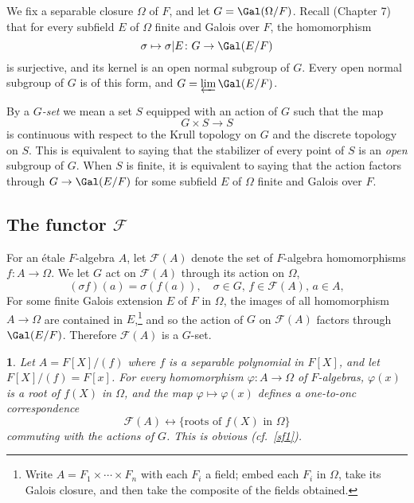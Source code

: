 \documentclass[a4paper,11pt,final,openany]{memoir}
\newtheorem{plain}[X]{}
\theoremstyle{nonumberplain}
\begin{document}
We fix a separable closure $\Omega$ of $F$, and let $G=\Gal(\Omega/F)$. Recall
(Chapter 7) that for every subfield $E$ of $\Omega$ finite and Galois over
$F$, the homomorphism%
\[
\sigma\mapsto\sigma|E\colon G\rightarrow\Gal(E/F)
\]
is surjective, and its kernel is an open normal subgroup of $G$. Every open
normal subgroup of $G$ is of this form, and $G=\varprojlim\Gal(E/F)$.

By a
%
$G$\emph{-set} we mean a set $S$ equipped with an action of $G$ such that the
map%
\[
G\times S\rightarrow S
\]
is continuous with respect to the Krull topology on $G$ and the discrete
topology on $S$. This is equivalent to saying that the stabilizer of every
point of $S$ is an \textit{open} subgroup of $G$. When $S$ is finite, it is
equivalent to saying that the action factors through $G\rightarrow\Gal(E/F)$
for some subfield $E$ of $\Omega$ finite and Galois over $F$.

\subsection{The functor $\mathcal{F}$}

For an \'{e}tale $F$-algebra $A$, let $\mathcal{F}{}(A)$ denote the set of
$F$-algebra homomorphisms $f\colon A\rightarrow\Omega$. We let $G$ act on
$\mathcal{F}{}(A)$ through its action on $\Omega$,%
\[
(\sigma f)(a)=\sigma(f(a)),\quad\sigma\in G\text{, }f\in\mathcal{F}%
{}(A)\text{, }a\in A,
\]
For some finite Galois extension $E$ of $F$ in $\Omega$, the images of all
homomorphism $A\rightarrow\Omega$ are contained in $E$,\footnote{Write
$A=F_{1}\times\cdots\times F_{n}$ with each $F_{i}$ a field; embed each
$F_{i}$ in $\Omega$, take its Galois closure, and then take the composite of
the fields obtained.} and so the action of $G$ on $\mathcal{F}(A)$ factors
through $\Gal(E/F)$. Therefore $\mathcal{F}{}(A)$ is a $G$-set.

\begin{plain}
\label{b74}Let $A=F[X]/(f)$ where $f$ is a separable polynomial in $F[X]$, and
let $F[X]/(f)=F[x]$. For every homomorphism $\varphi\colon A\rightarrow\Omega$
of $F$-algebras, $\varphi(x)$ is a root of $f(X)$ in $\Omega$, and the map
$\varphi\mapsto\varphi(x)$ defines a one-to-onc correspondence
\[
\mathcal{F}{}(A)\leftrightarrow\{\text{roots of }f(X)\text{ in }\Omega\}
\]
commuting with the actions of $G$. This is obvious (cf.~\ref{sf1}).
\end{plain}
\end{document}
